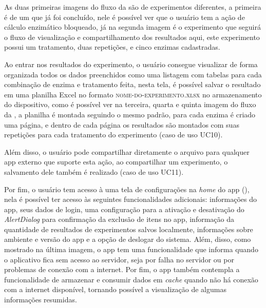 As duas primeiras imagens do fluxo da  são de experimentos diferentes, a primeira é de um que já foi concluído, nele é possível ver que o usuário tem a ação de cálculo enzimático bloqueado, já na segunda imagem é o experimento que seguirá o fluxo de visualização e compartilhamento dos resultados aqui, este experimento possui um tratamento, duas repetições, e cinco enzimas cadastradas.

Ao entrar nos resultados do experimento, o usuário consegue visualizar de forma organizada todos os dados preenchidos como uma listagem com tabelas para cada combinação de enzima e tratamento feita, nesta tela, é possível salvar o resultado em uma planilha Excel no formato \textsc{nome-do-experimento.xlsx} no armazenamento do dispositivo, como é possível ver na terceira, quarta e quinta imagem do fluxo da , a planilha é montada seguindo o mesmo padrão, para cada enzima é criado uma página, e dentro de cada página os resultados são montados com suas repetições para cada tratamento do experimento (caso de uso UC10).

Além disso, o usuário pode compartilhar diretamente o arquivo para qualquer \ac{app} externo que suporte esta ação, ao compartilhar um experimento, o salvamento dele também é realizado (caso de uso UC11).

Por fim, o usuário tem acesso à uma tela de configurações na \textit{home} do \ac{app} (), nela é possível ter acesso às seguintes funcionalidades adicionais: informações do \ac{app}, seus dados de login, uma configuração para a ativação e desativação do \textit{AlertDialog} para confirmação da exclusão de itens no \ac{app}, informação da quantidade de resultados de experimentos salvos localmente, informações sobre ambiente e versão do \ac{app} e a opção de deslogar do sistema. Além, disso, como mostrado na última imagem, o \ac{app} tem uma funcionalidade que informa quando o aplicativo fica sem acesso ao servidor, seja por falha no servidor ou por problemas de conexão com a internet. Por fim, o \ac{app} também contempla a funcionalidade de armazenar e consumir dados em \textit{cache} quando não há conexão com a internet disponível, tornando possível a visualização de algumas informações resumidas.

